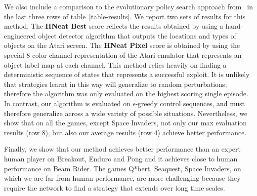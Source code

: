 We also include a comparison to the evolutionary policy search approach from~\cite{hausknecht-neuro} in the last three rows of table~\ref{table-results}.   
We report two sets of results for this method. The \textbf{HNeat Best} score reflects the results obtained by using a hand-engineered object detector algorithm that outputs the locations and types of objects on the Atari screen. The \textbf{HNeat Pixel} score is obtained by using the special 8 color channel representation of the Atari emulator that represents an object label map at each channel. 
This method relies heavily on finding a deterministic sequence of states that represents a successful exploit. It is unlikely that strategies learnt in this way will generalize to random perturbations; therefore the algorithm was only evaluated on the highest scoring single episode. In contrast, our algorithm is evaluated on $\epsilon$-greedy control sequences, and must therefore generalize across a wide variety of possible situations.  Nevertheless, we show that on all the games, except Space Invaders, not only our max evaluation results (row $8$), but also our average results (row $4$) achieve better performance.

Finally, we show that our method achieves better performance than an expert human player on Breakout, Enduro and Pong and it achieves close to human performance on Beam Rider. The games Q*bert, Seaquest, Space Invaders, on which we are far from human performance, are more challenging because they require the network to find a strategy that extends over long time scales.  

